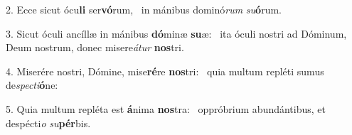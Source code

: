 2. Ecce sicut ócu\textbf{li} ser\textbf{vó}rum, \ast\  in mánibus dominó\textit{rum} \textit{su}\textbf{ó}rum.\

3. Sicut óculi ancíllæ in mánibus \textbf{dó}minæ \textbf{su}æ: \ast\  ita óculi nostri ad Dóminum, Deum nostrum, donec misere\textit{á}\textit{tur} \textbf{nos}tri.\

4. Miserére nostri, Dómine, mise\textbf{ré}re \textbf{nos}tri: \ast\  quia multum repléti sumus de\textit{spec}\textit{ti}\textbf{ó}ne:\

5. Quia multum repléta est \textbf{á}nima \textbf{nos}tra: \ast\  oppróbrium abundántibus, et despécti\textit{o} \textit{su}\textbf{pér}bis.\

